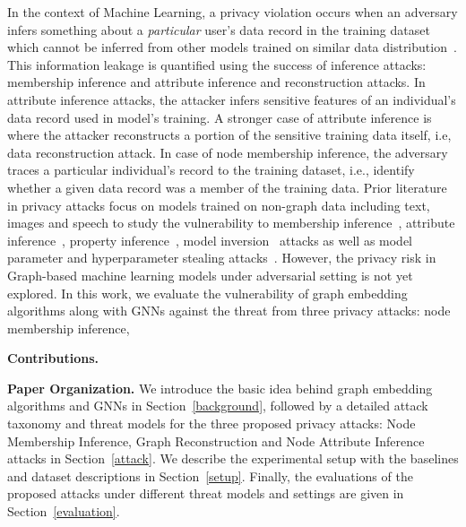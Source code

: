 In the context of Machine Learning, a privacy violation occurs when an adversary infers something about a \textit{particular} user's data record in the training dataset which cannot be inferred from other models trained on similar data distribution~\cite{7958568,8835245}.
This information leakage is quantified using the success of inference attacks: membership inference and attribute inference and reconstruction attacks.
In attribute inference attacks, the attacker infers sensitive features of an individual's data record used in model's training.
A stronger case of attribute inference is where the attacker reconstructs a portion of the sensitive training data itself, i.e, data reconstruction attack.
In case of node membership inference, the adversary traces a particular individual's record to the training dataset, i.e., identify whether a given data record was a member of the training data.
Prior literature in privacy attacks focus on models trained on non-graph data including text, images and speech to study the vulnerability to membership inference~\cite{7958568}, attribute inference~\cite{10.1504/IJSN.2015.071829}, property inference~\cite{10.1145/3243734.3243834}, model inversion~\cite{10.1145/2810103.2813677} attacks as well as model parameter and hyperparameter stealing attacks~\cite{10.5555/3241094.3241142,8418595}.
However, the privacy risk in Graph-based machine learning models under adversarial setting is not yet explored.
In this work, we evaluate the vulnerability of graph embedding algorithms along with GNNs against the threat from three privacy attacks: node membership inference,

\noindent\textbf{Contributions.}

\noindent\textbf{Paper Organization.}  We introduce the basic idea behind graph embedding algorithms and GNNs in Section~\ref{background}, followed by a detailed attack taxonomy and threat models for the three proposed privacy attacks: Node Membership Inference, Graph Reconstruction and Node Attribute Inference attacks in Section~\ref{attack}.
We describe the experimental setup with the baselines and dataset descriptions in Section~\ref{setup}.
Finally, the evaluations of the proposed attacks under different threat models and settings are given in Section~\ref{evaluation}.
